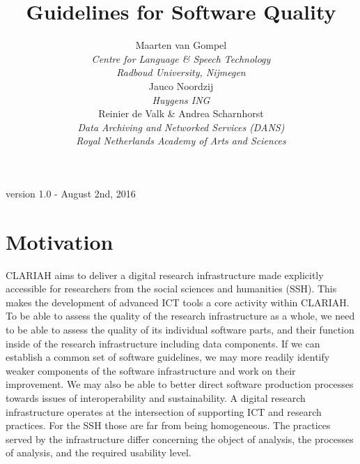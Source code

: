 \documentclass[a4paper,11pt]{article}
\newcommand{\subtitle}[1]{%
  \posttitle{%
    \par\end{center}
    \begin{center}\large#1\end{center}
    \vskip0.5em}%
}
\newenvironment{notice}{
\begin{center}
    \begin{tabular}[h!]{|p{0.8\textwidth}|}
    \hline
    {\bf IMPORTANT NOTICE!}\\\hline}
{   \\\hline
    \end{tabular}
\end{center}}
\begin{document}
\title{Guidelines for Software Quality}
\subtitle{CLARIAH Task 54.100} 
\author{Maarten van Gompel \\ 
\emph{Centre for Language \& Speech Technology} \\ \emph{Radboud University, Nijmegen} \\  
Jauco Noordzij \\	
\emph{Huygens ING} \\
Reinier de Valk \& Andrea Scharnhorst \\ 
\emph{Data Archiving and Networked Services (DANS)} \\ \emph{Royal Netherlands Academy of Arts and Sciences}}


\maketitle

\begin{center}
version 1.0 - August 2nd, 2016
\end{center}

%

\tableofcontents

\section{Motivation}

CLARIAH aims to deliver a digital research infrastructure made explicitly
accessible for researchers from the social sciences and humanities (SSH). This makes the development of
advanced ICT tools a core activity within CLARIAH. To be able to assess the
quality of the research infrastructure as a whole, we need to be able to assess
the quality of its individual software parts, and their function inside of the
research infrastructure including data components. If we can establish a common
set of software guidelines, we may more readily identify weaker components of
the software infrastructure and work on their improvement. We may also be able
to better direct software production processes towards issues of
interoperability and sustainability.  A digital research infrastructure
operates at the intersection of supporting ICT and research practices. For the SSH those are far from being homogeneous. The
practices served by the infrastructure differ concerning the object of
analysis, the processes of analysis, and the required usability level. 
\end{document}
